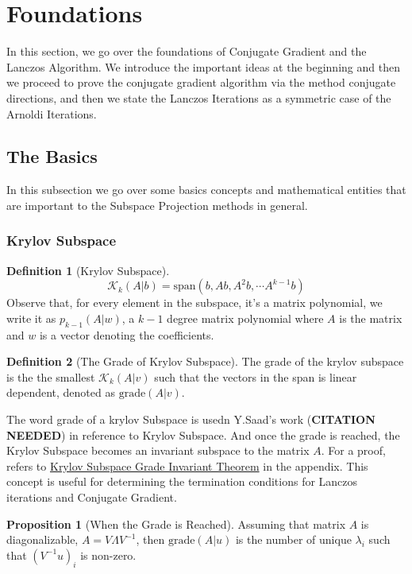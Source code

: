 \documentclass[]{article}
\theoremstyle{definition}
\newtheorem{prop}{Proposition}[section]  %
\newtheorem{definition}{Definition}
\begin{document}
\section{Foundations}
    In this section, we go over the foundations of Conjugate Gradient and the Lanczos Algorithm. We introduce the important ideas at the beginning and then we proceed to prove the conjugate gradient algorithm via the method conjugate directions, and then we state the Lanczos Iterations as a symmetric case of the Arnoldi Iterations. 
    \subsection{The Basics}
        In this subsection we go over some basics concepts and mathematical entities that are important to the Subspace Projection methods in general. 
        \subsubsection{Krylov Subspace}
            \begin{definition}[Krylov Subspace]
                $$
                \mathcal{K}_k(A|b) = \text{span}( b, Ab, A^2b, \cdots A^{k - 1}b)
                $$
                Observe that, for every element in the subspace, it's a matrix polynomial, we write it as $p_{k-1}(A|w)$, a $k-1$ degree matrix polynomial where $A$ is the matrix and $w$ is a vector denoting the coefficients. 
            \end{definition}
            \begin{definition}[The Grade of Krylov Subspace]
                The grade of the krylov subspace is the the smallest $\mathcal K_{k}(A|v)$ such that the vectors in the span is linear dependent, denoted as $\text{grade}(A|v)$. 
            \end{definition}
            The word grade of a krylov Subspace is usedn Y.Saad's work (\textbf{CITATION NEEDED}) in reference to Krylov Subspace. And once the grade is reached, the Krylov Subspace becomes an invariant subspace to the matrix $A$. For a proof, refers to \hyperref[prop:Krylov_Subspace_Grade_Invariant_Theorem]{Krylov Subspace Grade Invariant Theorem} in the appendix. This concept is useful for determining the termination conditions for Lanczos iterations and Conjugate Gradient. 
            \begin{prop}[When the Grade is Reached]\label{prop:When_the_Grade_is_Reached}
                Assuming that matrix $A$ is diagonalizable, $A = V\Lambda V^{-1}$, then $\text{grade}(A|u)$ is the number of unique $\lambda_i$ such that $(V^{-1}u)_i$ is non-zero. 
            \end{prop}
\end{document}

